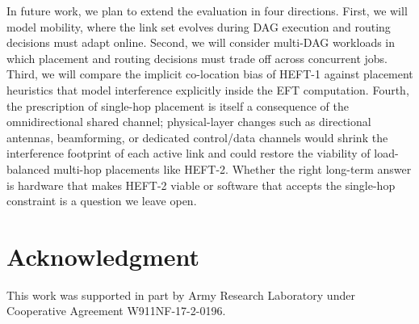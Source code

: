 \documentclass[conference]{IEEEtran}
\newcommand{\heftone}{HEFT-1}
\newcommand{\hefttwo}{HEFT-2}
\begin{document}
In future work, we plan to extend the evaluation in four directions.
First, we will model mobility, where the link set evolves during DAG
execution and routing decisions must adapt online. Second, we will
consider multi-DAG workloads in which placement and routing decisions
must trade off across concurrent jobs. Third, we will compare the
implicit co-location bias of \heftone{} against placement heuristics
that model interference explicitly inside the EFT computation. Fourth,
the prescription of single-hop placement is itself a consequence of the
omnidirectional shared channel; physical-layer changes such as
directional antennas, beamforming, or dedicated control/data channels
would shrink the interference footprint of each active link and could
restore the viability of load-balanced multi-hop placements like
\hefttwo{}. Whether the right long-term answer is hardware that makes
\hefttwo{} viable or software that accepts the single-hop constraint is
a question we leave open.

\section*{Acknowledgment}
This work was supported in part by Army Research Laboratory under Cooperative Agreement W911NF-17-2-0196.



\end{document}
